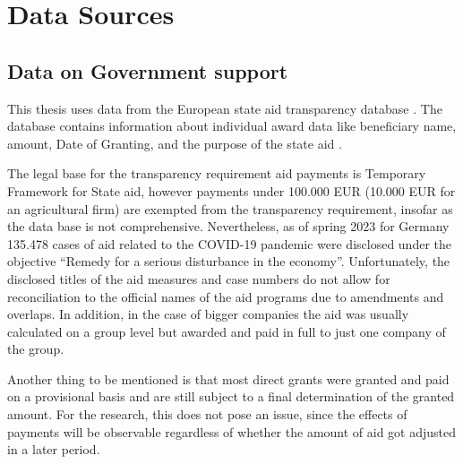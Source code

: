 
\chapter{Data Sources} %

\label{Chapter3} %


\section{Data on Government support}

This thesis uses data from the European state aid transparency database \parencite{eu_com_state_2023}. 
The database contains information about individual award data like beneficiary name, amount, Date of Granting, and the purpose of the state aid \parencite{eu_com_state_2023}. 

The legal base for the transparency requirement aid payments is Temporary Framework for State aid, however payments under 100.000 EUR (10.000 EUR for an agricultural firm) are exempted from the transparency requirement, insofar as the data base is not comprehensive. Nevertheless, as of spring 2023 for Germany 135.478 cases of aid related to the COVID-19 pandemic were disclosed under the objective “Remedy for a serious disturbance in the economy”. Unfortunately, the disclosed titles of the aid measures and case numbers do not allow for reconciliation to the official names of the aid programs due to amendments and overlaps. In addition, in the case of bigger companies the aid was usually calculated on a group level but awarded and paid in full to just one company of the group. 

Another thing to be mentioned is that most direct grants were granted and paid on a provisional basis and are still subject to a final determination of the granted amount. For the research, this does not pose an issue, since the effects of payments will be observable regardless of whether the amount of aid got adjusted in a later period. 






